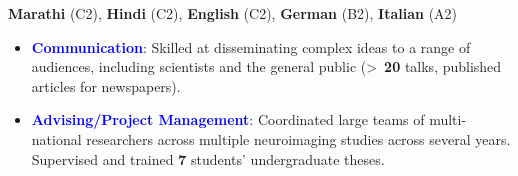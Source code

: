 \documentclass[10pt]{article}
\begin{document}
	\textbf{Marathi} (C2), \textbf{Hindi} (C2), \textbf{English} (C2), \textbf{German} (B2), \textbf{Italian} (A2)
	

	\begin{itemize}	
		
	\item \textcolor{blue}{\textbf{Communication}}: Skilled	at	disseminating complex ideas to a range of audiences, including scientists and the general public (\textgreater ~\textbf{20} talks, published articles for newspapers).	
	
	\item \textcolor{blue}{\textbf{Advising/Project Management}}: Coordinated large teams of multi-national researchers across multiple neuroimaging studies across several years. Supervised and trained \textbf{7} students' undergraduate theses.
	
     \end{itemize}	
	
	
\end{document}
